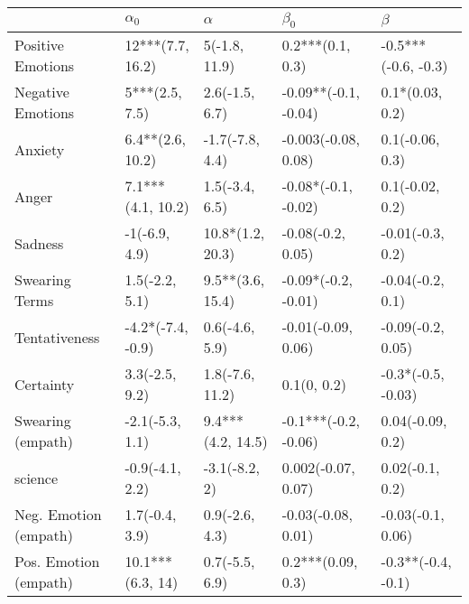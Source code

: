 \begin{tabular}{lllll}
\toprule
{} &         $\alpha_0$ &           $\alpha$ &             $\beta_0$ &              $\beta$ \\
\midrule
Positive Emotions     &   12***(7.7, 16.2) &      5(-1.8, 11.9) &      0.2***(0.1, 0.3) &  -0.5***(-0.6, -0.3) \\
Negative Emotions     &     5***(2.5, 7.5) &     2.6(-1.5, 6.7) &  -0.09**(-0.1, -0.04) &      0.1*(0.03, 0.2) \\
Anxiety               &   6.4**(2.6, 10.2) &    -1.7(-7.8, 4.4) &   -0.003(-0.08, 0.08) &      0.1(-0.06, 0.3) \\
Anger                 &  7.1***(4.1, 10.2) &     1.5(-3.4, 6.5) &   -0.08*(-0.1, -0.02) &      0.1(-0.02, 0.2) \\
Sadness               &      -1(-6.9, 4.9) &   10.8*(1.2, 20.3) &     -0.08(-0.2, 0.05) &     -0.01(-0.3, 0.2) \\
Swearing Terms        &     1.5(-2.2, 5.1) &   9.5**(3.6, 15.4) &   -0.09*(-0.2, -0.01) &     -0.04(-0.2, 0.1) \\
Tentativeness         &  -4.2*(-7.4, -0.9) &     0.6(-4.6, 5.9) &    -0.01(-0.09, 0.06) &    -0.09(-0.2, 0.05) \\
Certainty             &     3.3(-2.5, 9.2) &    1.8(-7.6, 11.2) &           0.1(0, 0.2) &   -0.3*(-0.5, -0.03) \\
Swearing (empath)     &    -2.1(-5.3, 1.1) &  9.4***(4.2, 14.5) &  -0.1***(-0.2, -0.06) &     0.04(-0.09, 0.2) \\
science               &    -0.9(-4.1, 2.2) &      -3.1(-8.2, 2) &    0.002(-0.07, 0.07) &      0.02(-0.1, 0.2) \\
Neg. Emotion (empath) &     1.7(-0.4, 3.9) &     0.9(-2.6, 4.3) &    -0.03(-0.08, 0.01) &    -0.03(-0.1, 0.06) \\
Pos. Emotion (empath) &   10.1***(6.3, 14) &     0.7(-5.5, 6.9) &     0.2***(0.09, 0.3) &   -0.3**(-0.4, -0.1) \\
\bottomrule
\end{tabular}

